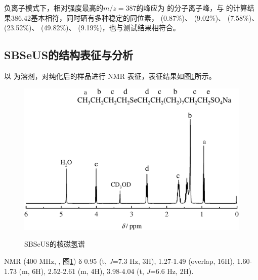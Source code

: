 \documentclass[bachelor,winfonts,replaceperiod]{jnuthesis}
\begin{document}
    负离子模式下，相对强度最高的$m/z = 387$的峰应为 的分子离子峰，与 
    的计算结果386.42基本相符，同时硒有多种稳定的同位素， (0.87\%)、 (9.02\%)、 (7.58\%)、
     (23.52\%)、 (49.82\%)、 (9.19\%)，也与测试结果相符合。
    
    \subsection{SBSeUS的结构表征与分析}
        以 为溶剂，对纯化后的样品进行  NMR 表征，表征结果如图\ref{fig:SBSeUS-nmr}所示。
    \begin{figure}[htbp]
        \centering
        \includegraphics[width=.7\textwidth]{figure/SBSeUS-nmr.pdf}\\
        \caption{SBSeUS的核磁氢谱}\label{fig:SBSeUS-nmr}
    \end{figure}
    
     NMR (400 MHz, , 图\ref{fig:SBSeUS-nmr}) δ 0.95 (t, \textit{J}=7.3 Hz, 3H), 1.27-1.49 (overlap, 16H), 
    1.60-1.73 (m, 6H), 2.52-2.61 (m, 4H), 3.98-4.04 (t, \textit{J}=6.6 Hz, 2H).
    
\end{document}
